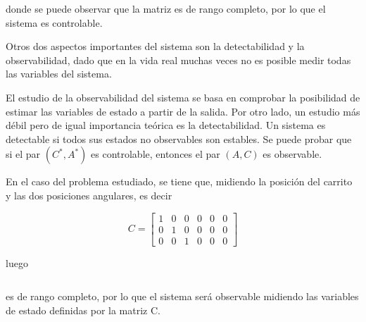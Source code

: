 donde se puede observar que la matriz es de rango completo, por lo que el sistema es controlable.


Otros dos aspectos importantes del sistema son la detectabilidad y la observabilidad, dado que en la vida real muchas veces no es posible medir todas las variables del sistema. 

El estudio de la observabilidad del sistema se basa en comprobar la posibilidad de estimar las variables de estado a partir de la salida. Por otro lado, un estudio más débil pero de igual importancia teórica es la detectabilidad. Un sistema es detectable si todos sus estados no observables son estables. Se puede probar que si el par $(C^*,A^*)$ es controlable, entonces el par $(A,C)$ es observable. 

En el caso del problema estudiado, se tiene que, midiendo la posición del carrito y las dos posiciones angulares, es decir

\begin{equation}
C = 	\begin{bmatrix}
1 & 0 & 0 & 0 & 0 & 0\\
0 & 1 & 0 & 0 & 0 & 0\\
0 & 0 & 1 & 0 & 0 & 0
\end{bmatrix}
\end{equation}

luego

\begin{equation}
[C^* \ A^*C^* \ \cdots \ A^{*n-1}C^*]
\end{equation}

es de rango completo, por lo que el sistema será observable midiendo las variables de estado definidas por la matriz C.

%
